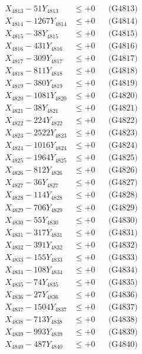 \documentclass[a4paper,10pt]{article}
\begin{document}
{\begin{align}
X_{4813} - 51Y_{4813} &\leq +0 && \text{(G4813)} \\
X_{4814} - 1267Y_{4814} &\leq +0 && \text{(G4814)} \\
X_{4815} - 38Y_{4815} &\leq +0 && \text{(G4815)} \\
X_{4816} - 431Y_{4816} &\leq +0 && \text{(G4816)} \\
X_{4817} - 309Y_{4817} &\leq +0 && \text{(G4817)} \\
X_{4818} - 811Y_{4818} &\leq +0 && \text{(G4818)} \\
X_{4819} - 380Y_{4819} &\leq +0 && \text{(G4819)} \\
X_{4820} - 1081Y_{4820} &\leq +0 && \text{(G4820)} \\
\allowbreak
X_{4821} - 38Y_{4821} &\leq +0 && \text{(G4821)} \\
X_{4822} - 224Y_{4822} &\leq +0 && \text{(G4822)} \\
X_{4823} - 2522Y_{4823} &\leq +0 && \text{(G4823)} \\
X_{4824} - 1016Y_{4824} &\leq +0 && \text{(G4824)} \\
X_{4825} - 1964Y_{4825} &\leq +0 && \text{(G4825)} \\
X_{4826} - 812Y_{4826} &\leq +0 && \text{(G4826)} \\
X_{4827} - 36Y_{4827} &\leq +0 && \text{(G4827)} \\
X_{4828} - 114Y_{4828} &\leq +0 && \text{(G4828)} \\
X_{4829} - 706Y_{4829} &\leq +0 && \text{(G4829)} \\
X_{4830} - 55Y_{4830} &\leq +0 && \text{(G4830)} \\
\allowbreak
X_{4831} - 317Y_{4831} &\leq +0 && \text{(G4831)} \\
X_{4832} - 391Y_{4832} &\leq +0 && \text{(G4832)} \\
X_{4833} - 155Y_{4833} &\leq +0 && \text{(G4833)} \\
X_{4834} - 108Y_{4834} &\leq +0 && \text{(G4834)} \\
X_{4835} - 74Y_{4835} &\leq +0 && \text{(G4835)} \\
X_{4836} - 27Y_{4836} &\leq +0 && \text{(G4836)} \\
X_{4837} - 1504Y_{4837} &\leq +0 && \text{(G4837)} \\
X_{4838} - 713Y_{4838} &\leq +0 && \text{(G4838)} \\
X_{4839} - 993Y_{4839} &\leq +0 && \text{(G4839)} \\
X_{4840} - 487Y_{4840} &\leq +0 && \text{(G4840)} \\

\end{align}}
\end{document}
